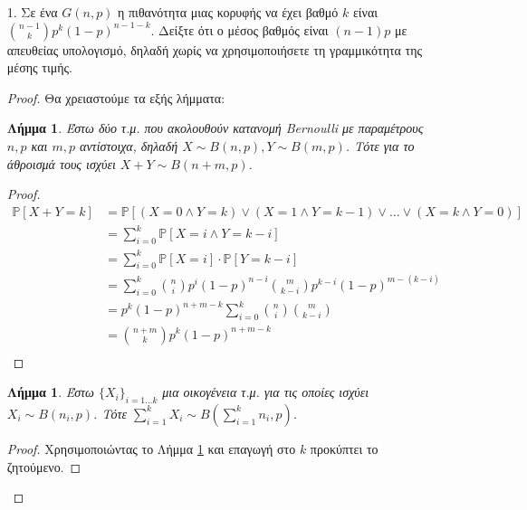 \documentclass[a4paper, oneside, 11pt]{article}
\newtheorem{lm}[thm]{Λήμμα}
\theoremstyle{definition}
\newcommand{\pr}{\mathbb{P}}
\begin{document}


\begin{enumerate}

\item[1.]
   Σε ένα $G(n, p)$ η πιθανότητα μιας κορυφής να έχει βαθμό $k$ είναι
   ${n-1 \choose k} p^k (1-p)^{n-1-k}$. Δείξτε ότι ο μέσος βαθμός είναι
   $(n-1)p$ με απευθείας υπολογισμό, δηλαδή χωρίς να χρησιμοποιήσετε τη
   γραμμικότητα της μέσης τιμής.

   \begin{proof}

      Θα χρειαστούμε τα εξής λήμματα:

      \begin{lm}
         \label{lm1.1}
         Έστω δύο τ.μ. που ακολουθούν κατανομή Bernoulli με παραμέτρους $n, p$
         και $m, p$ αντίστοιχα, δηλαδή $X \sim B(n, p), Y \sim B(m, p)$. Τότε για το
         άθροισμά τους ισχύει $X + Y \sim B(n + m, p)$.
      \end{lm}
      \begin{proof}
         \begin{align*}
            \pr[X + Y = k]
               &= \pr[(X = 0 \land Y = k) \lor (X = 1 \land Y = k-1) \lor
               \ldots \lor (X = k \land Y = 0) ] \\
               &= \sum_{i=0}^{k} \pr[X = i \land Y = k - i]\\
               &= \sum_{i=0}^{k} \pr[X = i] \cdot \pr[Y = k - i]\\
               &= \sum_{i=0}^{k} {n \choose i} p^i (1-p)^{n-i}
                                 {m \choose k-i} p^{k-i} (1-p)^{m - (k-i)}\\
               &= p^k (1-p)^{n + m - k} \sum_{i=0}^{k} { n \choose i }
                  {m \choose k - i}\\
               &= { n+m \choose k } p^k (1-p)^{n+m-k}\\
         \end{align*}
      \end{proof}

      \begin{lm}
         \label{lm1.2}
         Έστω $\{X_i\}_{i = 1 \ldots k}$ μια οικογένεια τ.μ. για τις οποίες
         ισχύει $X_i \sim B(n_i, p)$. Τότε $\sum_{i=1}^{k} X_i \sim B \left(
         \sum_{i=1}^{k} n_i, p \right)$.
      \end{lm}
      \begin{proof}
         Χρησιμοποιώντας το Λήμμα \ref{lm1.1} και επαγωγή στο $k$ προκύπτει το
         ζητούμενο.
      \end{proof}


\end{proof}
\end{enumerate}
\end{document}
